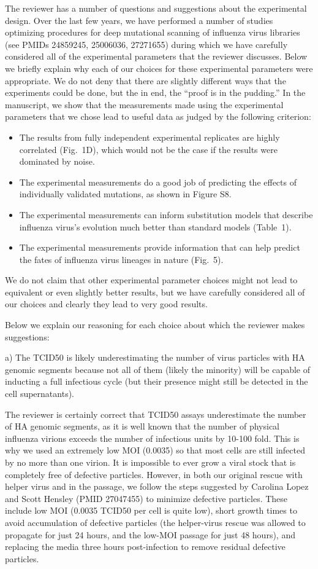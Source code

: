 \documentclass[11pt, oneside]{article}   	%
\newcommand{\response}[1]{{\color{black}#1}}
\begin{document}
\response{The reviewer has a number of questions and suggestions about the experimental design.
Over the last few years, we have performed a number of studies optimizing procedures for deep mutational scanning of influenza virus libraries (see PMIDs 24859245, 25006036, 27271655) during which we have carefully considered all of the experimental parameters that the reviewer discusses.
Below we briefly explain why each of our choices for these experimental parameters were appropriate.
We do not deny that there are slightly different ways that the experiments could be done, but the in end, the ``proof is in the pudding.'' 
In the manuscript, we show that the measurements made using the experimental parameters that we chose lead to useful data as judged by the following criterion:
\begin{itemize}
\item The results from fully independent experimental replicates are highly correlated (Fig.~1D), which would not be the case if the results were dominated by noise.
\item The experimental measurements do a good job of predicting the effects of individually validated mutations, as shown in Figure S8.
\item The experimental measurements can inform substitution models that describe influenza virus's evolution much better than standard models (Table~1).
\item The experimental measurements provide information that can help predict the fates of influenza virus lineages in nature (Fig.~5).
\end{itemize}
We do not claim that other experimental parameter choices might not lead to equivalent or even slightly better results, but we have carefully considered all of our choices and clearly they lead to very good results.

Below we explain our reasoning for each choice about which the reviewer makes suggestions:
}

a) The TCID50 is likely underestimating the number of virus particles with HA genomic segments because not all of them (likely the minority) will be capable of inducting a full infectious cycle (but their presence might still be detected in the cell supernatants). 

\response{The reviewer is certainly correct that TCID50 assays underestimate the number of HA genomic segments, as it is well known that the number of physical influenza virions exceeds the number of infectious units by 10-100 fold.
This is why we used an extremely low MOI (0.0035) so that most cells are still infected by no more than one virion.
It is impossible to ever grow a viral stock that is completely free of defective particles.
However, in both our original rescue with helper virus and in the passage, we follow the steps suggested by Carolina Lopez and Scott Hensley (PMID 27047455) to minimize defective particles.
These include low MOI (0.0035 TCID50 per cell is quite low), short growth times to avoid accumulation of defective particles (the helper-virus rescue was allowed to propagate for just 24 hours, and the low-MOI passage for just 48 hours), and replacing the media three hours post-infection to remove residual defective particles.
}
\end{document}
